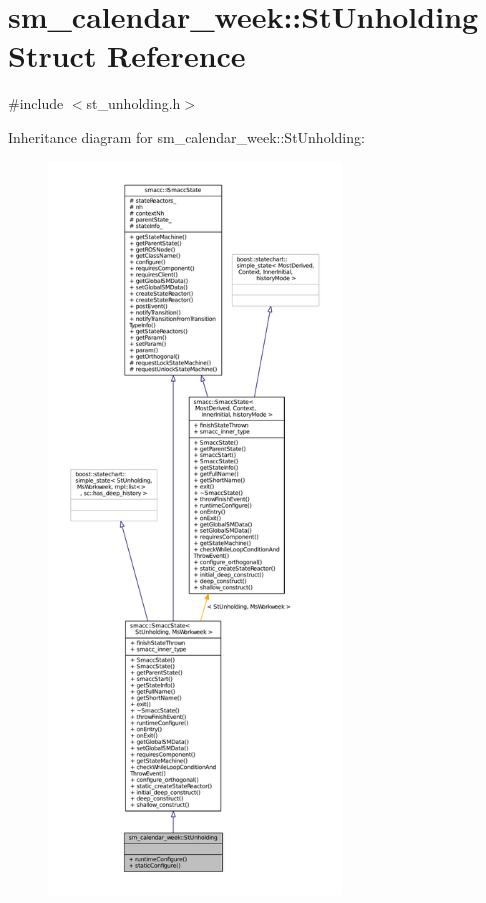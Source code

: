 \hypertarget{structsm__calendar__week_1_1StUnholding}{}\section{sm\+\_\+calendar\+\_\+week\+:\+:St\+Unholding Struct Reference}
\label{structsm__calendar__week_1_1StUnholding}


{\ttfamily \#include $<$st\+\_\+unholding.\+h$>$}



Inheritance diagram for sm\+\_\+calendar\+\_\+week\+:\+:St\+Unholding\+:
\nopagebreak
\begin{figure}[H]
\begin{center}
\leavevmode
\includegraphics[height=550pt]{structsm__calendar__week_1_1StUnholding__inherit__graph}
\end{center}
\end{figure}


